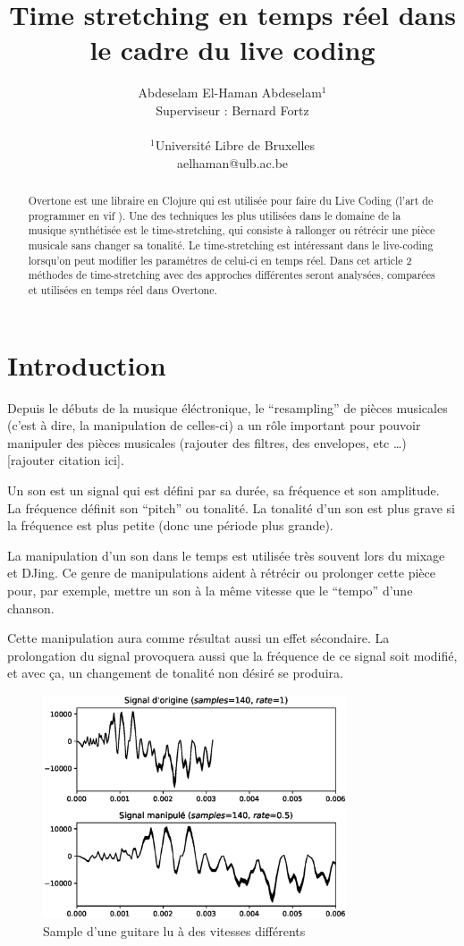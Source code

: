 \documentclass[letterpaper]{article}
\title{Time stretching en temps réel dans le cadre du live coding}
\author{Abdeselam El-Haman Abdeselam$^{1}$\\
Superviseur : Bernard Fortz
\mbox{}\\\\
$^1$Université Libre de Bruxelles \\
aelhaman@ulb.ac.be}
\begin{document}
\maketitle

\begin{abstract}
  Overtone est une libraire en Clojure qui est utilisée pour faire du
  Live Coding (l'art de programmer en \og vif \fg{}). Une des techniques les
  plus utilisées dans le domaine de la musique synthétisée est le
  time-stretching, qui consiste à rallonger ou rétrécir une pièce musicale
  sans changer sa tonalité. Le time-stretching est intéressant dans
  le live-coding lorsqu'on peut modifier les paramétres de celui-ci
  en temps réel. Dans cet article 2 méthodes de time-stretching avec des
  approches différentes seront analysées, comparées et utilisées en temps
  réel dans Overtone.

\end{abstract}

\section{Introduction}

  Depuis le débuts de la musique éléctronique, le ``resampling'' de pièces musicales
  (c'est à dire, la manipulation de celles-ci) a un rôle important pour pouvoir manipuler
  des pièces musicales (rajouter des filtres, des envelopes, etc \ldots ) [rajouter citation ici].

  Un son est un signal qui est défini par sa durée, sa fréquence et son amplitude. La fréquence
  définit son ``pitch'' ou tonalité. La tonalité d'un son est plus grave si la fréquence est plus
  petite (donc une période plus grande).
  
  La manipulation d'un son dans le temps est utilisée très souvent lors du mixage et DJing.
  Ce genre de manipulations aident à rétrécir ou prolonger cette pièce pour, par exemple, mettre
  un son à la même vitesse que le ``tempo'' d'une chanson.

  Cette manipulation aura comme résultat aussi un effet sécondaire. La prolongation du signal
  provoquera aussi que la fréquence de ce signal soit modifié, et avec ça, un changement
  de tonalité non désiré se produira.

  \begin{figure}[h]
    \centerline{\includegraphics[width=9cm]{res/fig1.eps}}
    \caption{\label{fig:guitar-stretch}Sample d'une guitare lu à des vitesses différents}
  \end{figure}
  
\end{document}
